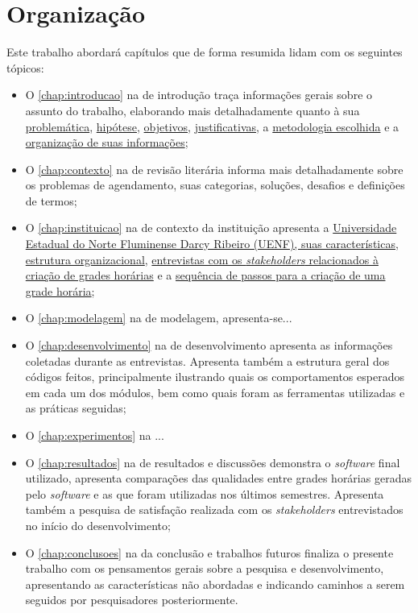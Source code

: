 \section{Organização} \label{sec:Organização} %

Este trabalho abordará capítulos que de forma resumida lidam com os seguintes tópicos:

\begin{itemize}
  \item O \autoref{chap:introducao} na  de introdução traça informações gerais sobre o assunto do trabalho, elaborando mais detalhadamente quanto à sua \hyperref[sec:Problemáticas]{problemática}, \hyperref[sec:Hipótese]{hipótese}, \hyperref[sec:Objetivos]{objetivos}, \hyperref[sec:Justificativas]{justificativas}, a \hyperref[sec:Metodologia]{metodologia escolhida} e a \hyperref[sec:Organização]{organização de suas informações};
  \item O \autoref{chap:contexto} na  de revisão literária informa mais detalhadamente sobre os problemas de agendamento, suas categorias, soluções, desafios e definições de termos;
  \item O \autoref{chap:instituicao} na  de contexto da instituição apresenta a \hyperref[sec:estatuto]{Universidade Estadual do Norte Fluminense Darcy Ribeiro (UENF), suas características, estrutura organizacional}, \hyperref[sec:entrevistas]{entrevistas com os \textit{stakeholders} relacionados à criação de grades horárias} e a \hyperref[sec:sequencia]{sequência de passos para a criação de uma grade horária};
  \item O \autoref{chap:modelagem} na  de modelagem, apresenta-se...
  \item O \autoref{chap:desenvolvimento} na  de desenvolvimento apresenta as informações coletadas durante as entrevistas. Apresenta também a estrutura geral dos códigos feitos, principalmente ilustrando quais os comportamentos esperados em cada um dos módulos, bem como quais foram as ferramentas utilizadas e as práticas seguidas;
  \item O \autoref{chap:experimentos} na ...
  \item O \autoref{chap:resultados} na  de resultados e discussões demonstra o \textit{software} final utilizado, apresenta comparações das qualidades entre grades horárias geradas pelo \textit{software} e as que foram utilizadas nos últimos semestres. Apresenta também a pesquisa de satisfação realizada com os \textit{stakeholders} entrevistados no início do desenvolvimento;
  \item O \autoref{chap:conclusoes} na  da conclusão e trabalhos futuros finaliza o presente trabalho com os pensamentos gerais sobre a pesquisa e desenvolvimento, apresentando as características não abordadas e indicando caminhos a serem seguidos por pesquisadores posteriormente.
\end{itemize}
